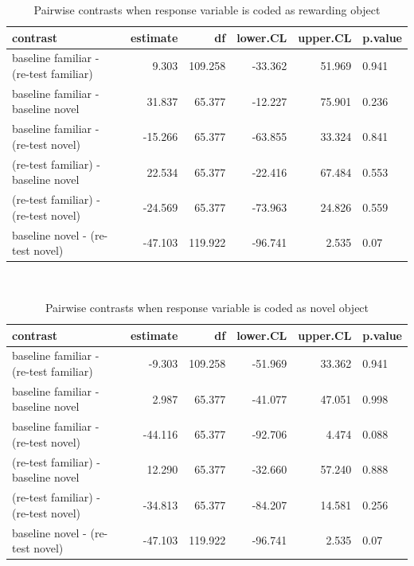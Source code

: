 \documentclass[]{book}
\begin{document}
\begin{table}

\caption{\label{tab:contrasts-table3}Pairwise contrasts when response variable is coded as rewarding object}
\centering
\begin{tabular}[t]{l|r|r|r|r|l}
\hline
contrast & estimate & df & lower.CL & upper.CL & p.value\\
\hline
baseline familiar - (re-test familiar) & 9.303 & 109.258 & -33.362 & 51.969 & 0.941\\
\hline
baseline familiar - baseline novel & 31.837 & 65.377 & -12.227 & 75.901 & 0.236\\
\hline
baseline familiar - (re-test novel) & -15.266 & 65.377 & -63.855 & 33.324 & 0.841\\
\hline
(re-test familiar) - baseline novel & 22.534 & 65.377 & -22.416 & 67.484 & 0.553\\
\hline
(re-test familiar) - (re-test novel) & -24.569 & 65.377 & -73.963 & 24.826 & 0.559\\
\hline
baseline novel - (re-test novel) & -47.103 & 119.922 & -96.741 & 2.535 & 0.07\\
\hline
\end{tabular}
\end{table}

~

\begin{table}

\caption{\label{tab:contrasts-table4}Pairwise contrasts when response variable is coded as novel object}
\centering
\begin{tabular}[t]{l|r|r|r|r|l}
\hline
contrast & estimate & df & lower.CL & upper.CL & p.value\\
\hline
baseline familiar - (re-test familiar) & -9.303 & 109.258 & -51.969 & 33.362 & 0.941\\
\hline
baseline familiar - baseline novel & 2.987 & 65.377 & -41.077 & 47.051 & 0.998\\
\hline
baseline familiar - (re-test novel) & -44.116 & 65.377 & -92.706 & 4.474 & 0.088\\
\hline
(re-test familiar) - baseline novel & 12.290 & 65.377 & -32.660 & 57.240 & 0.888\\
\hline
(re-test familiar) - (re-test novel) & -34.813 & 65.377 & -84.207 & 14.581 & 0.256\\
\hline
baseline novel - (re-test novel) & -47.103 & 119.922 & -96.741 & 2.535 & 0.07\\
\hline
\end{tabular}
\end{table}
\end{document}
